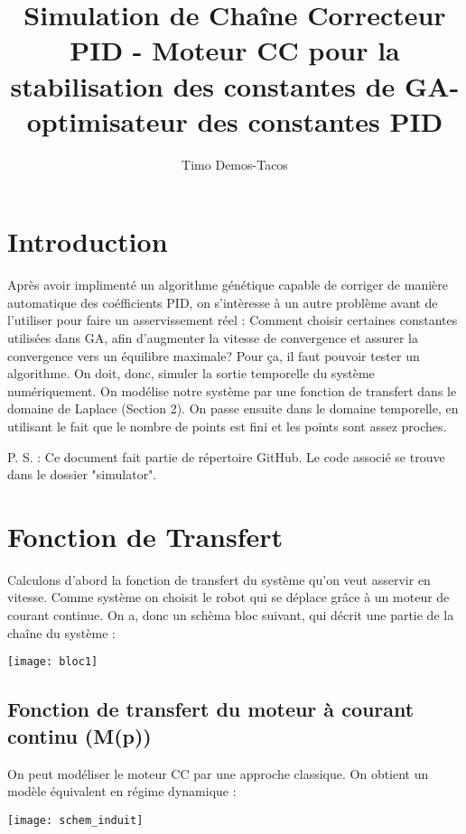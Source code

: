 \documentclass[11pt]{article} %
\title{Simulation de Chaîne Correcteur PID - Moteur CC pour la stabilisation des constantes de GA-optimisateur des constantes PID}
\author{Timo Demos-Tacos}
\begin{document}
\maketitle

\section{Introduction}

Après avoir implimenté un algorithme génétique capable de corriger de manière automatique des coéfficients PID, on s'intèresse à un autre problème avant de l'utiliser pour faire un asservissement réel : Comment choisir certaines constantes utilisées dans GA, afin d'augmenter la vitesse de convergence et assurer la convergence vers un équilibre maximale? Pour ça, il faut pouvoir tester un algorithme. On doit, donc, simuler la sortie temporelle du système numériquement. On modélise notre système par une fonction de transfert dans le domaine de Laplace (Section 2). On passe ensuite dans le domaine temporelle, en utilisant le fait que le nombre de points est fini et les points sont assez proches.

P. S. : Ce document fait partie de répertoire GitHub. Le code associé se trouve dans le dossier "simulator".


\section{Fonction de Transfert}

Calculons d'abord la fonction de transfert du système qu'on veut asservir en vitesse. Comme système on choisit le robot qui se déplace grâce à un moteur de courant continue. On a, donc un schèma bloc suivant, qui décrit une partie de la chaîne du système :
\begin{center}
\texttt{[image: bloc1]}
\end{center}

\subsection{Fonction de transfert du moteur à courant continu (M(p))}

On peut modéliser le moteur CC par une approche classique. On obtient un modèle équivalent en régime dynamique :

\begin{center}
\texttt{[image: schem\_induit]}
\end{center}
\end{document}
